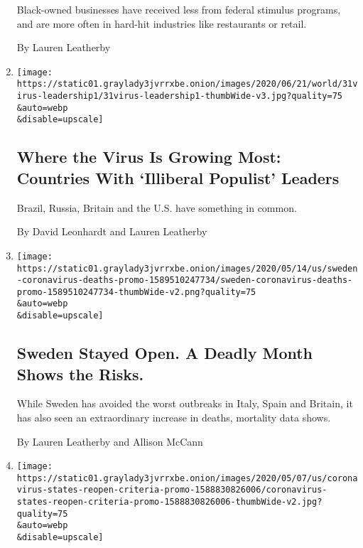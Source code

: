 \begin{enumerate}
  Black-owned businesses have received less from federal stimulus
  programs, and are more often in hard-hit industries like restaurants
  or retail.

  By Lauren Leatherby
\item
  \href{/2020/06/02/briefing/coronavirus-populist-leaders.html}{}

  \texttt{[image: https://static01.graylady3jvrrxbe.onion/images/2020/06/21/world/31virus-leadership1/31virus-leadership1-thumbWide-v3.jpg?quality=75\\\&auto=webp\\\&disable=upscale]}

  \hypertarget{where-the-virus-is-growing-most-countries-with-illiberal-populist-leaders}{%
  \subsection{Where the Virus Is Growing Most: Countries With `Illiberal
  Populist'
  Leaders}\label{where-the-virus-is-growing-most-countries-with-illiberal-populist-leaders}}

  Brazil, Russia, Britain and the U.S. have something in common.

  By David Leonhardt and Lauren Leatherby
\item
  \href{/interactive/2020/05/15/world/europe/sweden-coronavirus-deaths.html}{}

  \texttt{[image: https://static01.graylady3jvrrxbe.onion/images/2020/05/14/us/sweden-coronavirus-deaths-promo-1589510247734/sweden-coronavirus-deaths-promo-1589510247734-thumbWide-v2.png?quality=75\\\&auto=webp\\\&disable=upscale]}

  \hypertarget{sweden-stayed-open-a-deadly-month-shows-the-risks}{%
  \subsection{Sweden Stayed Open. A Deadly Month Shows the
  Risks.}\label{sweden-stayed-open-a-deadly-month-shows-the-risks}}

  While Sweden has avoided the worst outbreaks in Italy, Spain and
  Britain, it has also seen an extraordinary increase in deaths,
  mortality data shows.

  By Lauren Leatherby and Allison McCann
\item
  \href{/interactive/2020/05/07/us/coronavirus-states-reopen-criteria.html}{}

  \texttt{[image: https://static01.graylady3jvrrxbe.onion/images/2020/05/07/us/coronavirus-states-reopen-criteria-promo-1588830826006/coronavirus-states-reopen-criteria-promo-1588830826006-thumbWide-v2.jpg?quality=75\\\&auto=webp\\\&disable=upscale]}


\end{enumerate}
